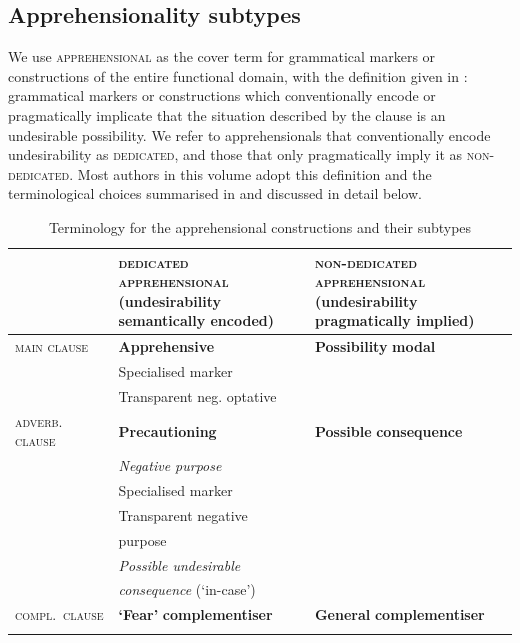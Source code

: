 \documentclass[output=paper,colorlinks,citecolor=brown]{langscibook}
\begin{document}
\subsection{Apprehensionality subtypes}
\label{subsec:apprsubtypes}

We use \textsc{apprehensional} as the cover term for grammatical markers or constructions of the entire functional domain, with the definition given in : grammatical markers or constructions which conventionally encode or pragmatically implicate that the situation described by the clause is an undesirable possibility. We refer to apprehensionals that conventionally encode undesirability as \textsc{dedicated}, and those that only pragmatically imply it as \textsc{non-dedicated}. Most authors in this volume adopt this definition and the terminological choices summarised in  and discussed in detail below.

\begin{table}
\caption{Terminology for the apprehensional constructions and their subtypes}
\label{tab1_alternative}
\begin{tabular}{L{1.4cm}L{4.6cm}L{4.6cm}}
\lsptoprule

& {\bfseries \textsc{dedicated} \textsc{apprehensional}}
 \textrm{(undesirability semantically encoded)} 
 & {\bfseries \textsc{non-dedicated} \textsc{apprehensional}}
 \textrm{(undesirability pragmatically implied)}\\\midrule

\textsc{main clause} & {\bfseries Apprehensive} & \textrm{\textbf{Possibility} \textbf{modal}} \\
& \hspace{8pt} \textrm{Specialised marker} & \\
& \hspace{8pt} \textrm{Transparent neg. optative} & \\
\textsc{adverb. clause} & \textrm{\textbf{Precautioning}} & \textrm{\textbf{Possible} \textbf{consequence}}\\
& \hspace{8pt} \textrm{\textit{Negative purpose}} & \\
& \hspace{16pt} \textrm{Specialised marker}    &   \\    
& \hspace{16pt} \textrm{Transparent negative} &  \\
& \hspace{16pt} \textrm{purpose} & \\
& \hspace{8pt} \textit{Possible undesirable} \\
& \hspace{8pt} \textit{consequence} \textrm{(`in-case')} & \\

\textsc{compl.\ clause} & \textrm{\textbf{`Fear'} \textbf{complementiser}} & \textrm{\textbf{General} \textbf{complementiser}} \\
\lspbottomrule
\end{tabular}
\end{table}
\end{document}
